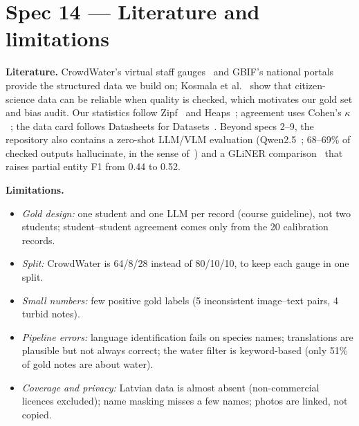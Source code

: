 \section{Spec 14 --- Literature and limitations}

\textbf{Literature.} CrowdWater's virtual staff gauges~\cite{seibert2019crowdwater} and GBIF's national
portals~\cite{gbif} provide the structured data we build on; Kosmala et al.~\cite{kosmala2016quality} show that
citizen-science data can be reliable when quality is checked, which motivates our gold set and bias audit.
Our statistics follow Zipf~\cite{zipf1949human} and Heaps~\cite{heaps1978information}; agreement uses Cohen's
$\kappa$~\cite{cohen1960kappa}; the data card follows Datasheets for Datasets~\cite{gebru2021datasheets}. Beyond specs
2--9, the repository also contains a zero-shot LLM/VLM evaluation (Qwen2.5~\cite{qwen2024qwen25,bai2025qwen25vl};
68--69\% of checked outputs hallucinate, in the sense of~\cite{ji2023hallucination}) and a GLiNER
comparison~\cite{zaratiana2024gliner} that raises partial entity F1 from 0.44 to 0.52.


\textbf{Limitations.}
\begin{itemize}
  \item \emph{Gold design:} one student and one LLM per record (course guideline), not two students; student--student
        agreement comes only from the 20 calibration records.
  \item \emph{Split:} CrowdWater is 64/8/28 instead of 80/10/10, to keep each gauge in one split.
  \item \emph{Small numbers:} few positive gold labels (5 inconsistent image--text pairs, 4 turbid notes).
  \item \emph{Pipeline errors:} language identification fails on species names; translations are plausible but not
        always correct; the water filter is keyword-based (only 51\% of gold notes are about water).
  \item \emph{Coverage and privacy:} Latvian data is almost absent (non-commercial licences excluded); name masking
        misses a few names; photos are linked, not copied.
\end{itemize}
